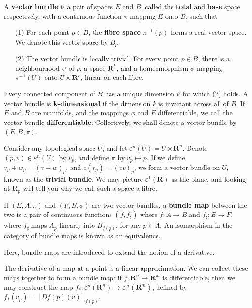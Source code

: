 \begin{definition}
    A {\bf vector bundle} is a pair of spaces $E$ and $B$, called the {\bf total} and {\bf base} space respectively, with a continuous function $\pi$ mapping $E$ onto $B$, such that
    \begin{enumerate}
        \item[(1)] For each point $p \in B$, the {\bf fibre space} $\pi^{-1}(p)$ forms a real vector space. We denote this vector space by $B_p$.
        \item[(2)] The vector bundle is locally trivial. For every point $p \in B$, there is a neighbourhood $U$ of $p$, a space $\mathbf{R}^k$, and a homeomorphism $\phi$ mapping $\pi^{-1}(U)$ onto $U \times \mathbf{R}^k$, linear on each fibre.
    \end{enumerate}
    Every connected component of $B$ has a unique dimension $k$ for which (2) holds. A vector bundle is {\bf k-dimensional} if the dimension $k$ is invariant across all of $B$. If $E$ and $B$ are manifolds, and the mappings $\phi$ and $E$ differentiable, we call the vector bundle {\bf differentiable}. Collectively, we shall denote a vector bundle by $(E,B,\pi)$.
\end{definition}

\begin{example}
    Consider any topological space $U$, and let $\varepsilon^n(U) = U \times \mathbf{R}^n$. Denote $(p,v) \in \varepsilon^n(U)$ by $v_p$, and define $\pi$ by $v_p \mapsto p$. If we define $v_p + w_p = (v + w)_p$, and $c(v_p) = (cv)_p$, we form a vector bundle on $U$, known as the {\bf trivial bundle}. We may picture $\varepsilon^1(\mathbf{R})$ as the plane, and looking at $\mathbf{R}_p$ will tell you why we call such a space a fibre.
\end{example}

\begin{definition}
    If $(E,A,\pi)$ and $(F,B,\phi)$ are two vector bundles, a {\bf bundle map} between the two is a pair of continuous functions $(f,f_\sharp)$ where $f:A \to B$ and $f_\sharp:E \to F$, where $f_\sharp$ maps $A_p$ linearly into $B_{f(p)}$, for any $p \in A$. An isomorphism in the category of bundle maps is known as an equivalence.
\end{definition}

Here, bundle maps are introduced to extend the notion of a derivative.

\begin{example}
    The derivative of a map at a point is a linear approximation. We can collect these maps together to form a bundle map: if $f:\mathbf{R}^n \to \mathbf{R}^m$ is differentiable, then we may construct the map $f_*:\varepsilon^n(\mathbf{R}^n) \to \varepsilon^m(\mathbf{R}^m)$, defined by $f_*(v_p) = [Df(p)(v)]_{f(p)}$.
\end{example}

